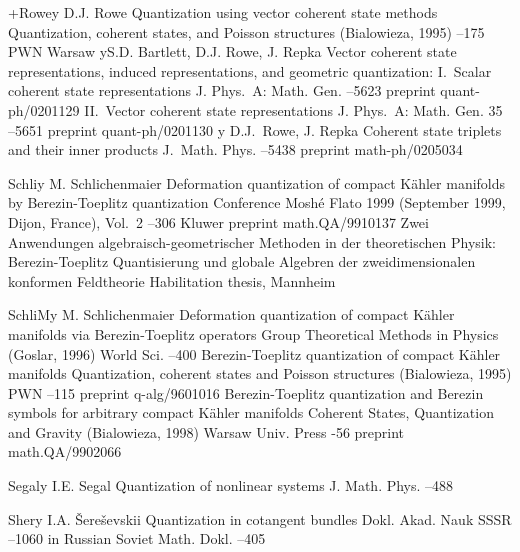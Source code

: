 \documentclass[11pt]{amsart}
\numberwithin{equation}{section}
\theoremstyle{remark}
\newcommand{\by}{\mathbf y}
\begin{document}
\begin{thebibliography}{199}
 +Rowe\by{ D.J. Rowe \paper Quantization using vector coherent state
methods \inbook Quantization, coherent states, and Poisson structures
(Bialowieza, 1995) --175 \publ PWN \publaddr Warsaw 
\moreref \by S.D. Bartlett, D.J. Rowe, J. Repka \paper Vector coherent state
representations, induced representations, and geometric quantization:
I.~Scalar coherent state representations \jour J. Phys.~A: Math. Gen. 
 --5623 \paperinfo preprint quant-ph/0201129 \moreref \paper
II.~Vector coherent state representations \jour  J. Phys.~A: Math. Gen. 35  --5651 \paperinfo preprint quant-ph/0201130 \moreref \by
D.J.~Rowe, J. Repka \paper Coherent state triplets and their inner products
\jour J.~Math. Phys.   --5438 \paperinfo preprint
math-ph/0205034}

 Schli\by{ M. Schlichenmaier \paper Deformation quantization of compact
K\"ahler manifolds by Berezin-Toeplitz quantization \inbook Conference Mosh\'e
Flato 1999 (September 1999, Dijon, France), Vol.~2 --306 \publ Kluwer
 \paperinfo preprint math.QA/9910137 \moreref \book Zwei Anwendungen
algebraisch-geometrischer Methoden in der theoretischen Physik:
Berezin-Toeplitz Quantisierung und globale Algebren der zweidimensionalen
konformen Feldtheorie \bookinfo Habilitation thesis, Mannheim }

 SchliM\by{ M. Schlichenmaier \paper Deformation quantization of compact
K\"ahler manifolds via Berezin-Toeplitz operators \inbook Group Theoretical
Methods in Physics (Goslar, 1996) \publ World Sci.  --400
\moreref \paper Berezin-Toeplitz quantization of compact K\"ahler manifolds
\inbook Quantization, coherent states and Poisson structures (Bialowieza, 1995)
\publ PWN --115  \paperinfo preprint q-alg/9601016 \moreref
\paper Berezin-Toeplitz quantization and Berezin symbols for arbitrary compact
K\"ahler manifolds \inbook  Coherent States, Quantization and Gravity
(Bialowieza, 1998)  \publ Warsaw Univ. Press  -56 \paperinfo
preprint math.QA/9902066}

 Segal\by{ I.E. Segal \paper Quantization of nonlinear systems \jour J.
Math. Phys.   --488}

 Sher\by{ I.A. \v Sere\v sevskii \paper Quantization in cotangent bundles
\jour Dokl. Akad. Nauk SSSR   --1060 \lang in
Russian \transl Soviet Math. Dokl.   --405}


\end{thebibliography}
\end{document}
